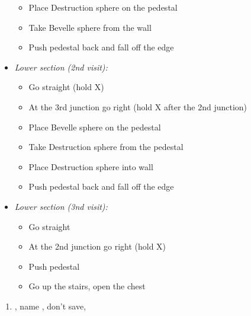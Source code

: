 \begin{trial}
\begin{itemize}
\begin{itemize}
            \item Place Destruction sphere on the pedestal
            \item Take Bevelle sphere from the wall
            \item Push pedestal back and fall off the edge
        \end{itemize}
        \item \textit{Lower section (2nd visit):}
        \begin{itemize}
            \item Go straight (hold X)
            \item At the 3rd junction go right (hold X after the 2nd junction)
            \item Place Bevelle sphere on the pedestal
            \item Take Destruction sphere from the pedestal
            \item Place Destruction sphere into wall
            \item Push pedestal back and fall off the edge
        \end{itemize}
        \item \textit{Lower section (3nd visit):}
        \begin{itemize}
            \item Go straight
            \item At the 2nd junction go right (hold X)
            \item Push pedestal
            \item Go up the stairs, open the chest
        \end{itemize}
    \end{itemize}
\end{trial}
\begin{enumerate}[resume]
    \item \sd, name \bahamut, don't save, \sd
\end{enumerate}
\lossvfill
\ 
\losscb
\ \lossnewline \ 
